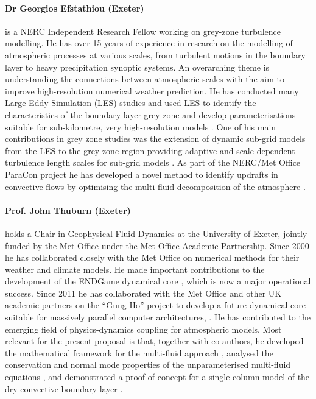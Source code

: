 \documentclass[11pt,a4paper]{article}
\begin{document}
\paragraph*{Dr Georgios Efstathiou (Exeter)} is a NERC Independent Research Fellow working on grey-zone turbulence modelling. He has over 15 years of experience in research on the modelling of
atmospheric processes at various scales, from turbulent motions in the boundary layer
to heavy precipitation synoptic systems. An overarching theme is understanding the
connections between atmospheric scales with the aim to improve high-resolution
numerical weather prediction. He has conducted many Large Eddy Simulation (LES) studies and used LES to identify 
the characteristics of the boundary-layer grey zone \citep[e.g.][]{efstathiou2015}
and develop parameterisations suitable for sub-kilometre, very high-resolution models 
\citep{efstathiou2016}. One of his main contributions in grey zone 
studies was the extension of dynamic sub-grid models from the LES to the grey zone region 
providing adaptive and scale dependent turbulence length scales for sub-grid models 
\citep{efstathiou2018,efstathiou2019a}. As part of the NERC/Met Office ParaCon 
project he has developed a novel method to identify updrafts in convective flows 
by optimising the multi-fluid decomposition of the atmosphere \citep{ETB20}.

\paragraph*{Prof. John Thuburn (Exeter)} holds a Chair in Geophysical Fluid Dynamics at the University of Exeter, jointly
funded by the Met Office under the Met Office Academic Partnership.
Since 2000 he has collaborated closely with the Met Office on numerical methods for their
weather and climate models. He made important contributions to the development of the
ENDGame dynamical core \cite[e.g.][]{WSW+14}, which is now a major operational success.
Since 2011 he has collaborated with the Met Office and other UK academic partners on the ``Gung-Ho''
project to develop a future dynamical core suitable for massively parallel computer
architectures, \citep[e.g.][]{MBS+19}.
He has contributed to the emerging field of physics-dynamics coupling for atmospheric models.
Most relevant for the present proposal is that,
together with co-authors, he developed the mathematical framework for the multi-fluid
approach \citep[][]{TWV+18}, analysed the conservation and normal mode properties
of the unparameterised multi-fluid equations \citep[][]{TV18}, and demonstrated
a proof of concept for a single-column model of the dry convective boundary-layer \citep[][]{TEB19}.
\end{document}

